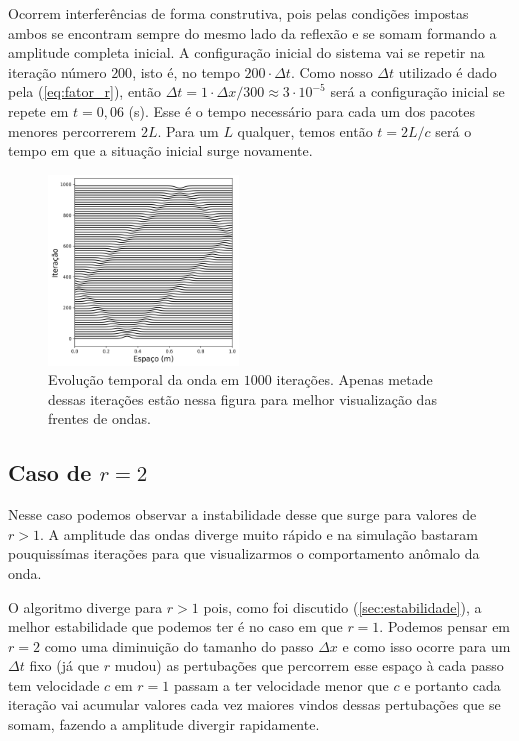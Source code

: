 \documentclass[a4paper, 11pt]{article}
\begin{document}
Ocorrem interferências de forma construtiva, pois pelas condições impostas ambos se encontram sempre
do mesmo lado da reflexão e se somam formando a amplitude completa inicial.
A configuração inicial do sistema vai se repetir na iteração número $200$, isto é, no tempo
\( 200 \cdot \Delta t \). Como nosso \( \Delta t\) utilizado é dado pela (\ref{eq:fator_r}), então \( \Delta t = 1 \cdot
\Delta x / 300  \approx 3 \cdot 10^{-5} \) será a configuração inicial se repete em \( t = 0,06 \) (s). Esse
é o tempo necessário para cada um dos pacotes menores percorrerem \( 2 L\). Para um \( L \)
qualquer, temos então \( t = 2 L / c \) será o tempo em que a situação inicial surge novamente.


\begin{figure}[h!] 
    \centering
    \centering
    \includegraphics[width=0.45\textwidth]{graf-tarefa1-a}
    \caption{Evolução temporal da onda em $1000$ iterações. Apenas metade dessas iterações  estão nessa figura para melhor visualização das frentes de ondas.}
    \label{fig:tarefa1-a}
\end{figure}

\clearpage
\subsection{Caso de \( r = 2 \) }
\label{sec:caso_r_2}

Nesse caso podemos observar a instabilidade desse que surge para valores de \( r > 1  \).
A amplitude das ondas diverge muito rápido e na simulação bastaram pouquissímas iterações
para que visualizarmos o comportamento anômalo  da onda.

O algoritmo diverge para \( r > 1 \) pois, como foi discutido (\ref{sec:estabilidade}), a melhor
estabilidade que podemos ter é no caso em que \( r = 1 \). Podemos pensar em \( r = 2 \) como uma
diminuição do tamanho do passo \( \Delta x\) e como isso ocorre para um \( \Delta t \) fixo (já que $r$ mudou)
as pertubações que percorrem esse espaço à cada passo tem velocidade \( c \) em \( r = 1 \) passam a
ter velocidade menor que \( c \) e portanto cada iteração vai acumular valores cada vez maiores
vindos dessas pertubações que se somam, fazendo a amplitude divergir rapidamente.
\end{document}

